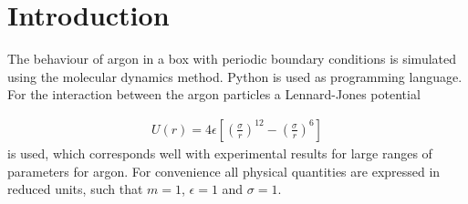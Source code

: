 \section{Introduction}
The behaviour of argon in a box with periodic boundary conditions is simulated using the molecular dynamics method. Python is used as programming language. For the interaction between the argon particles a Lennard-Jones potential

\begin{gather*}
U(r) = 4\epsilon \left[\left(\frac{\sigma}{r}\right)^{12}-\left(\frac{\sigma}{r}\right)^6\right]
\end{gather*}
is used, which corresponds well with experimental results for large ranges of parameters\cite{hoover1970comparison} for argon. For convenience all physical quantities are expressed in reduced units, such that $m=1$, $\epsilon = 1$ and $\sigma = 1$. 

